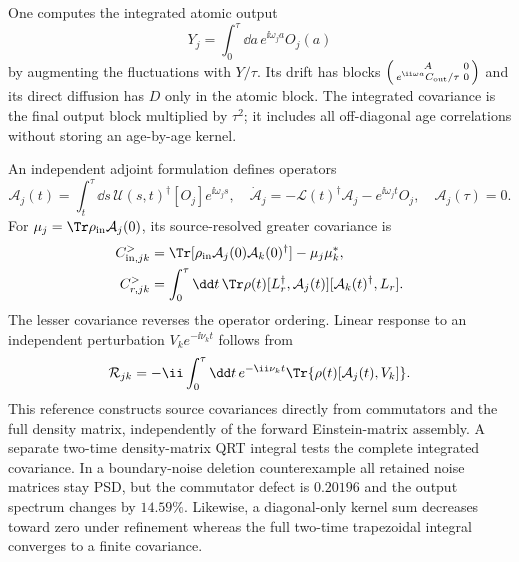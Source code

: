 One computes the integrated atomic output
\begin{equation}
 Y_j=\int_0^\tau\dd a\,e^{\ii\omega_j a}O_j(a)
 \label{eq:gc-integrated-output}
\end{equation}
by augmenting the fluctuations with $Y/\tau$. Its drift has blocks
$\left(\begin{smallmatrix}A&0\\e^{\ii\omega a}C_{\rm out}/\tau&0\end{smallmatrix}\right)$
and its direct diffusion has $D$ only in the atomic block. The integrated
covariance is the final output block multiplied by $\tau^2$; it includes all
off-diagonal age correlations without storing an age-by-age kernel.

An independent adjoint formulation defines operators
\begin{equation}
 \mathcal A_j(t)=\int_t^\tau\dd s\,
  \mathcal U(s,t)^\dagger[O_j]e^{\ii\omega_js},\quad
 \dot{\mathcal A}_j=-\mathcal L(t)^\dagger\mathcal A_j-e^{\ii\omega_jt}O_j,
 \quad\mathcal A_j(\tau)=0.
 \label{eq:gc-adjoint-output}
\end{equation}
For $\mu_j=\Tr\rho_{\rm in}\mathcal A_j(0)$, its source-resolved greater
covariance is
\begin{align}
 C_{{\rm in},jk}^>&=\Tr[\rho_{\rm in}\mathcal A_j(0)\mathcal A_k(0)^\dagger]-\mu_j\mu_k^*,
 \label{eq:gc-adjoint-boundary}\\
 C_{r,jk}^>&=\int_0^\tau\dd t\,
 \Tr\rho(t)[L_r^\dagger,\mathcal A_j(t)]
                   [\mathcal A_k(t)^\dagger,L_r].
 \label{eq:gc-adjoint-jumps}
\end{align}
The lesser covariance reverses the operator ordering. Linear response to an
independent perturbation $V_ke^{-\ii\nu_kt}$ follows from
\begin{equation}
 \mathcal R_{jk}=-\ii\int_0^\tau\dd t\,
 e^{-\ii\nu_kt}\Tr\{\rho(t)[\mathcal A_j(t),V_k]\}.
 \label{eq:gc-adjoint-response}
\end{equation}
This reference constructs source covariances directly from commutators and
the full density matrix, independently of the forward Einstein-matrix
assembly. A separate two-time density-matrix QRT integral tests the complete
integrated covariance. In a boundary-noise deletion counterexample all
retained noise matrices stay PSD, but the commutator defect is $0.20196$ and
the output spectrum changes by $14.59\%$. Likewise, a diagonal-only kernel
sum decreases toward zero under refinement whereas the full two-time
trapezoidal integral converges to a finite covariance.

